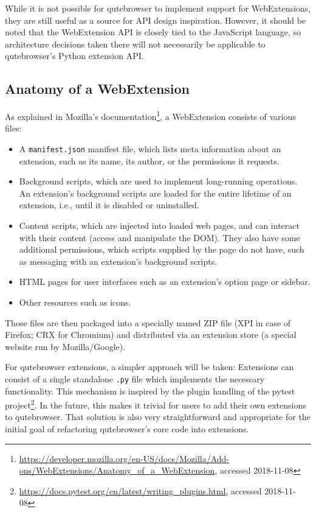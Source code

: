 \documentclass[a4paper,parskip=full]{scrreprt}
\begin{document}
While it is not possible for qutebrowser to implement support for WebExtensions,
they are still useful as a source for API design inspiration. However, it
should be noted that the WebExtension API is closely tied to the JavaScript
language, so architecture decisions taken there will not necessarily be
applicable to qutebrowser's Python extension API.

\subsection{Anatomy of a WebExtension}
\label{anatomy}

As explained in Mozilla's
documentation\footnote{\url{https://developer.mozilla.org/en-US/docs/Mozilla/Add-ons/WebExtensions/Anatomy_of_a_WebExtension},
  accessed 2018-11-08},
a WebExtension consists of various files:

\begin{itemize}
  \item A \verb|manifest.json| manifest file, which lists meta information about
    an extension, such as its name, its author, or the permissions it requests.
  \item Background scripts, which are used to implement long-running operations.
    An extension's background scripts are loaded for the entire lifetime of an
    extension, i.e., until it is disabled or uninstalled.
  \item Content scripts, which are injected into loaded web pages, and can
    interact with their content (access and manipulate the DOM). They also have
    some additional permissions, which scripts supplied by the page do not have,
    such as messaging with an extension's background scripts.
  \item HTML pages for user interfaces such as an extension's option page or sidebar.
  \item Other resources such as icons.
\end{itemize}

Those files are then packaged into a specially named ZIP file (XPI in case of
Firefox; CRX for Chromium) and distributed via an extension store (a special
website run by Mozilla/Google).

For qutebrowser extensions, a simpler approach will be taken: Extensions can
consist of a single standalone \verb|.py| file which implements the necessary
functionality. This mechanism is inspired by the plugin handling of the pytest
project\footnote{\url{https://docs.pytest.org/en/latest/writing_plugins.html},
  accessed 2018-11-08}. In the future, this makes it trivial for users to add
their own extensions to qutebrowser. That solution is also very straightforward and
appropriate for the initial goal of refactoring qutebrowser's core code into
extensions.
\end{document}
